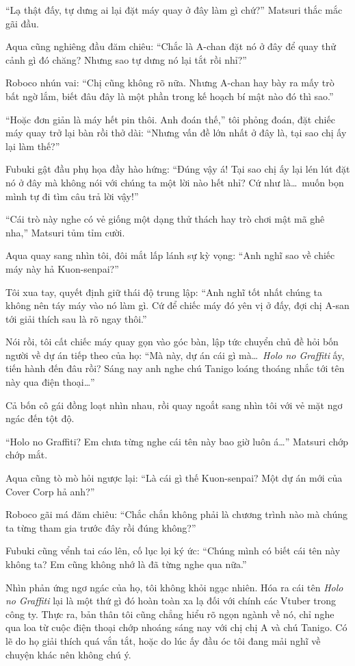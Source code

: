 \documentclass[../main.tex]{subfiles}
\begin{document}
``Lạ thật đấy, tự dưng ai lại đặt máy quay ở đây làm gì chứ?'' Matsuri thắc mắc gãi đầu.

Aqua cũng nghiêng đầu đăm chiêu: ``Chắc là A-chan đặt nó ở đây để quay thử cảnh gì đó chăng? Nhưng sao tự dưng nó lại tắt rồi nhỉ?''

Roboco nhún vai: ``Chị cũng không rõ nữa. Nhưng A-chan hay bày ra mấy trò bất ngờ lắm, biết đâu đây là một phần trong kế hoạch bí mật nào đó thì sao.''

``Hoặc đơn giản là máy hết pin thôi. Anh đoán thế,'' tôi phỏng đoán, đặt chiếc máy quay trở lại bàn rồi thở dài: ``Nhưng vấn đề lớn nhất ở đây là, tại sao chị ấy lại làm thế?''

Fubuki gật đầu phụ họa đầy hào hứng: ``Đúng vậy á! Tại sao chị ấy lại lén lút đặt nó ở đây mà không nói với chúng ta một lời nào hết nhỉ? Cứ như là\dots\ muốn bọn mình tự đi tìm câu trả lời vậy!''

``Cái trò này nghe có vẻ giống một dạng thử thách hay trò chơi mật mã ghê nha,'' Matsuri tủm tỉm cười.

Aqua quay sang nhìn tôi, đôi mắt lấp lánh sự kỳ vọng: ``Anh nghĩ sao về chiếc máy này hả Kuon-senpai?''

Tôi xua tay, quyết định giữ thái độ trung lập: ``Anh nghĩ tốt nhất chúng ta không nên táy máy vào nó làm gì. Cứ để chiếc máy đó yên vị ở đấy, đợi chị A-san tới giải thích sau là rõ ngay thôi.''

Nói rồi, tôi cất chiếc máy quay gọn vào góc bàn, lập tức chuyển chủ đề hỏi bốn người về dự án tiếp theo của họ: ``Mà này, dự án cái gì mà\dots\ \textit{Holo no Graffiti} ấy, tiến hành đến đâu rồi? Sáng nay anh nghe chú Tanigo loáng thoáng nhắc tới tên này qua điện thoại\dots''

Cả bốn cô gái đồng loạt nhìn nhau, rồi quay ngoắt sang nhìn tôi với vẻ mặt ngơ ngác đến tột độ.

``Holo no Graffiti? Em chưa từng nghe cái tên này bao giờ luôn á\dots'' Matsuri chớp chớp mắt.

Aqua cũng tò mò hỏi ngược lại: ``Là cái gì thế Kuon-senpai? Một dự án mới của Cover Corp hả anh?''

Roboco gãi má đăm chiêu: ``Chắc chắn không phải là chương trình nào mà chúng ta từng tham gia trước đây rồi đúng không?''

Fubuki cũng vểnh tai cáo lên, cố lục lọi ký ức: ``Chúng mình có biết cái tên này không ta? Em cũng không nhớ là đã từng nghe qua nữa.''

Nhìn phản ứng ngơ ngác của họ, tôi không khỏi ngạc nhiên. Hóa ra cái tên \textit{Holo no Graffiti} lại là một thứ gì đó hoàn toàn xa lạ đối với chính các Vtuber trong công ty. Thực ra, bản thân tôi cũng chẳng hiểu rõ ngọn ngành về nó, chỉ nghe qua loa từ cuộc điện thoại chớp nhoáng sáng nay với chị chị A và chú Tanigo. Có lẽ do họ giải thích quá vắn tắt, hoặc do lúc ấy đầu óc tôi đang mải nghĩ về chuyện khác nên không chú ý.
\end{document}
